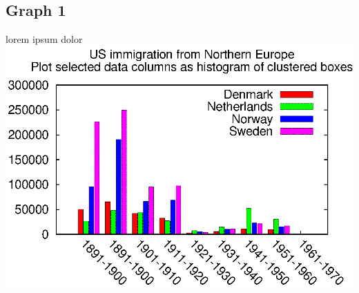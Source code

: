 \documentclass[11pt,a4paper,titlepage]{article}
\begin{document}
\subsection{Graph 1}
lorem ipsum dolor
\includegraphics{graphs/immigration.eps}
\newpage
\thispagestyle{empty}
\end{document}
